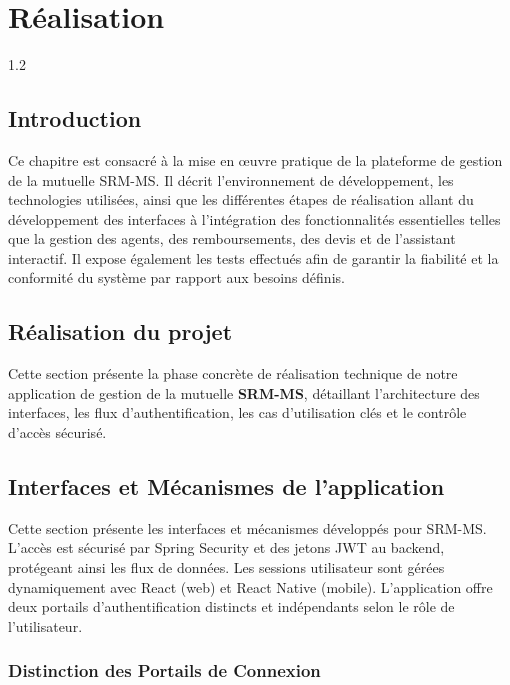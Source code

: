 \chapter{Réalisation}
\begin{spacing}{1.2}
\minitoc
\thispagestyle{MyStyle}
\end{spacing}
\newpage

\section{Introduction}
Ce chapitre est consacré à la mise en œuvre pratique de la plateforme de gestion de la mutuelle SRM-MS. Il décrit l'environnement de développement, les technologies utilisées, ainsi que les différentes étapes de réalisation allant du développement des interfaces à l'intégration des fonctionnalités essentielles telles que la gestion des agents, des remboursements, des devis et de l'assistant interactif. Il expose également les tests effectués afin de garantir la fiabilité et la conformité du système par rapport aux besoins définis.

\section{Réalisation du projet}
\label{sec:realisation_projet}

Cette section présente la phase concrète de réalisation technique de notre application de gestion de la mutuelle \textbf{SRM-MS}, détaillant l'architecture des interfaces, les flux d'authentification, les cas d'utilisation clés et le contrôle d'accès sécurisé.

\section{Interfaces et Mécanismes de l'application}
\label{subsec:authentification}

Cette section présente les interfaces et mécanismes développés pour SRM-MS. L'accès est sécurisé par Spring Security et des jetons JWT au backend, protégeant ainsi les flux de données. Les sessions utilisateur sont gérées dynamiquement avec React (web) et React Native (mobile). L'application offre deux portails d'authentification distincts et indépendants selon le rôle de l'utilisateur.

\subsection{Distinction des Portails de Connexion}


